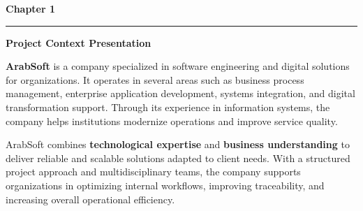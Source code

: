 \newpage

\fancyhead[R]{}
\fancyfoot[C]{\thepage}
\pagestyle{fancy}

\thispagestyle{plain}

{}

\begin{center}
  {\fontsize{20}{24}\selectfont \textbf{Chapter 1}}
\end{center}

\noindent\rule{\textwidth}{0.4pt}

\vspace{0.3cm}

\begin{center}
  {\fontsize{20}{24}\selectfont \textbf{Project Context Presentation}}
\end{center}

\vspace{0.6cm}



{\fontsize{12}{18}\selectfont
\setlength{\parindent}{1.2cm}
\setlength{\parskip}{6pt}

\indent \textbf{ArabSoft} is a company specialized in software engineering and digital solutions for organizations. It operates in several areas such as business process management, enterprise application development, systems integration, and digital transformation support. Through its experience in information systems, the company helps institutions modernize operations and improve service quality.

\indent ArabSoft combines \textbf{technological expertise} and \textbf{business understanding} to deliver reliable and scalable solutions adapted to client needs. With a structured project approach and multidisciplinary teams, the company supports organizations in optimizing internal workflows, improving traceability, and increasing overall operational efficiency.

}

